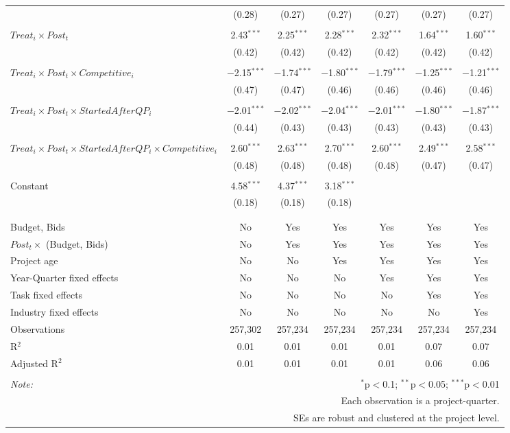 \documentclass[
]{article}
\begin{document}
\begin{table}[H]
\begin{tabular}{@{\extracolsep{-3pt}}lcccccc}
  & (0.28) & (0.27) & (0.27) & (0.27) & (0.27) & (0.27) \\ 
  & & & & & & \\ 
 $Treat_i \times Post_t$ & 2.43$^{***}$ & 2.25$^{***}$ & 2.28$^{***}$ & 2.32$^{***}$ & 1.64$^{***}$ & 1.60$^{***}$ \\ 
  & (0.42) & (0.42) & (0.42) & (0.42) & (0.42) & (0.42) \\ 
  & & & & & & \\ 
 $Treat_i \times Post_t \times Competitive_i$ & $-$2.15$^{***}$ & $-$1.74$^{***}$ & $-$1.80$^{***}$ & $-$1.79$^{***}$ & $-$1.25$^{***}$ & $-$1.21$^{***}$ \\ 
  & (0.47) & (0.47) & (0.46) & (0.46) & (0.46) & (0.46) \\ 
  & & & & & & \\ 
 $Treat_i \times Post_t \times StartedAfterQP_i$ & $-$2.01$^{***}$ & $-$2.02$^{***}$ & $-$2.04$^{***}$ & $-$2.01$^{***}$ & $-$1.80$^{***}$ & $-$1.87$^{***}$ \\ 
  & (0.44) & (0.43) & (0.43) & (0.43) & (0.43) & (0.43) \\ 
  & & & & & & \\ 
 $Treat_i \times Post_t \times StartedAfterQP_i \times Competitive_i$ & 2.60$^{***}$ & 2.63$^{***}$ & 2.70$^{***}$ & 2.60$^{***}$ & 2.49$^{***}$ & 2.58$^{***}$ \\ 
  & (0.48) & (0.48) & (0.48) & (0.48) & (0.47) & (0.47) \\ 
  & & & & & & \\ 
 Constant & 4.58$^{***}$ & 4.37$^{***}$ & 3.18$^{***}$ &  &  &  \\ 
  & (0.18) & (0.18) & (0.18) &  &  &  \\ 
  & & & & & & \\ 
\hline \\[-1.8ex] 
Budget, Bids & No & Yes & Yes & Yes & Yes & Yes \\ 
$Post_t \times $  (Budget, Bids) & No & Yes & Yes & Yes & Yes & Yes \\ 
Project age & No & No & Yes & Yes & Yes & Yes \\ 
Year-Quarter fixed effects & No & No & No & Yes & Yes & Yes \\ 
Task fixed effects & No & No & No & No & Yes & Yes \\ 
Industry fixed effects & No & No & No & No & No & Yes \\ 
Observations & 257,302 & 257,234 & 257,234 & 257,234 & 257,234 & 257,234 \\ 
R$^{2}$ & 0.01 & 0.01 & 0.01 & 0.01 & 0.07 & 0.07 \\ 
Adjusted R$^{2}$ & 0.01 & 0.01 & 0.01 & 0.01 & 0.06 & 0.06 \\ 
\hline 
\hline \\[-1.8ex] 
\textit{Note:}  & \multicolumn{6}{r}{$^{*}$p$<$0.1; $^{**}$p$<$0.05; $^{***}$p$<$0.01} \\ 
 & \multicolumn{6}{r}{Each observation is a project-quarter.} \\ 
 & \multicolumn{6}{r}{SEs are robust and clustered at the project level.} \\ 
\end{tabular} 
\end{table}
\end{document}
